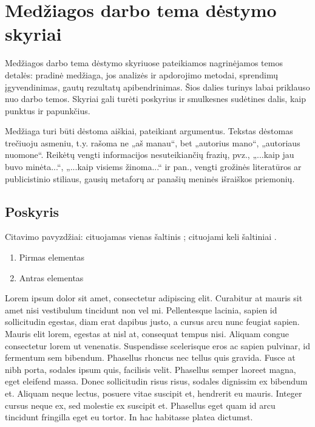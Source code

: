 \documentclass{VUMIFPSkursinis}
\begin{document}
\section{Medžiagos darbo tema dėstymo skyriai}
Medžiagos darbo tema dėstymo skyriuose pateikiamos nagrinėjamos temos detalės:
pradinė medžiaga, jos analizės ir apdorojimo metodai, sprendimų įgyvendinimas,
gautų rezultatų apibendrinimas. Šios dalies turinys labai priklauso nuo darbo
temos. Skyriai gali turėti poskyrius ir smulkesnes sudėtines dalis, kaip
punktus ir papunkčius.

Medžiaga turi būti dėstoma aiškiai, pateikiant argumentus. Tekstas dėstomas
trečiuoju asmeniu, t.y. rašoma ne „aš manau“, bet „autorius mano“, „autoriaus
nuomone“. Reikėtų vengti informacijos nesuteikiančių frazių, pvz., „...kaip jau
buvo minėta...“, „...kaip visiems žinoma...“ ir pan., vengti grožinės literatūros
ar publicistinio stiliaus, gausių metaforų ar panašių meninės išraiškos
priemonių.

\subsection{Poskyris}
Citavimo pavyzdžiai: cituojamas vienas šaltinis \cite{PvzStraipsnLt}; cituojami
keli šaltiniai \cite{PvzStraipsnEn, PvzKonfLt, PvzKonfEn, PvzKnygLt, PvzKnygEn,
PvzElPubLt, PvzElPubEn, PvzMagistrLt, PvzPhdEn}.

\begin{enumerate}
	\item Pirmas elementas
	\item Antras elementas
\end{enumerate}

Lorem ipsum dolor sit amet, consectetur adipiscing elit. Curabitur at mauris sit amet nisi vestibulum tincidunt non vel mi. Pellentesque lacinia, sapien id sollicitudin egestas, diam erat dapibus justo, a cursus arcu nunc feugiat sapien. Mauris elit lorem, egestas at nisl at, consequat tempus nisi. Aliquam congue consectetur lorem ut venenatis. Suspendisse scelerisque eros ac sapien pulvinar, id fermentum sem bibendum. Phasellus rhoncus nec tellus quis gravida. Fusce at nibh porta, sodales ipsum quis, facilisis velit. Phasellus semper laoreet magna, eget eleifend massa. Donec sollicitudin risus risus, sodales dignissim ex bibendum et. Aliquam neque lectus, posuere vitae suscipit et, hendrerit eu mauris. Integer cursus neque ex, sed molestie ex suscipit et. Phasellus eget quam id arcu tincidunt fringilla eget eu tortor. In hac habitasse platea dictumst.
\end{document}
